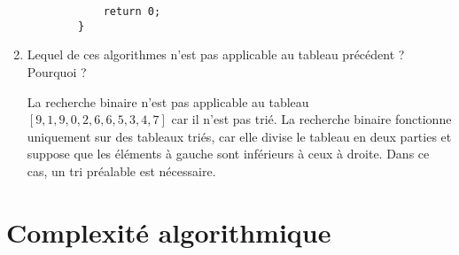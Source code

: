 \begin{enumerate}
\begin{lstlisting}
			return 0;
		}
	\end{lstlisting}
	
	\item Lequel de ces algorithmes n'est pas applicable au tableau précédent ? Pourquoi ?
	
	La recherche binaire n'est pas applicable au tableau \([9, 1, 9, 0, 2, 6, 6, 5, 3, 4, 7]\) car il n'est pas trié. La recherche binaire fonctionne uniquement sur des tableaux triés, car elle divise le tableau en deux parties et suppose que les éléments à gauche sont inférieurs à ceux à droite. Dans ce cas, un tri préalable est nécessaire.
\end{enumerate}

\section{Complexité algorithmique}


